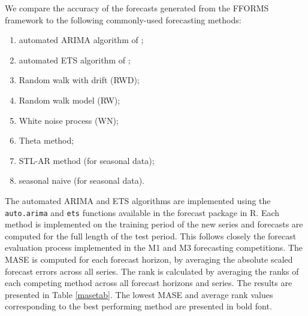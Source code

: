 \documentclass[11pt,a4paper,]{article}
\providecommand{\tightlist}{%
  \setlength{\itemsep}{0pt}\setlength{\parskip}{0pt}}
\begin{document}
We compare the accuracy of the forecasts generated from the FFORMS framework to the following commonly-used forecasting methods:

\begin{enumerate}
\def\labelenumi{\arabic{enumi}.}
\tightlist
\item
  automated ARIMA algorithm of \textcite{Hyndman2008};
\item
  automated ETS algorithm of \textcite{Hyndman2008};
\item
  Random walk with drift (RWD);
\item
  Random walk model (RW);
\item
  White noise process (WN);
\item
  Theta method;
\item
  STL-AR method (for seasonal data);
\item
  seasonal naive (for seasonal data).
\end{enumerate}

The automated ARIMA and ETS algorithms are implemented using the \texttt{auto.arima} and \texttt{ets} functions available in the forecast package in R. Each method is implemented on the training period of the new series and forecasts are computed for the full length of the test period. This follows closely the forecast evaluation process implemented in the M1 and M3 forecasting competitions. The MASE is computed for each forecast horizon, by averaging the absolute scaled forecast errors across all series. The rank is calculated by averaging the ranks of each competing method across all forecast horizons and series. The results are presented in Table \ref{masetab}. The lowest MASE and average rank values corresponding to the best performing method are presented in bold font.
\end{document}
